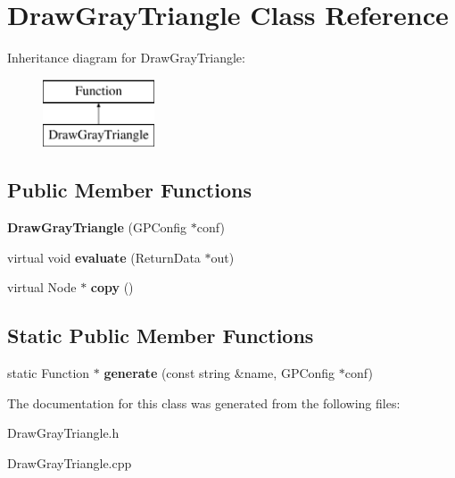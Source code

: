 \hypertarget{class_draw_gray_triangle}{\section{Draw\-Gray\-Triangle Class Reference}
\label{class_draw_gray_triangle}
}
Inheritance diagram for Draw\-Gray\-Triangle\-:\begin{figure}[H]
\begin{center}
\leavevmode
\includegraphics[height=2.000000cm]{class_draw_gray_triangle}
\end{center}
\end{figure}
\subsection*{Public Member Functions}
\begin{DoxyCompactItemize}
\item 
\hypertarget{class_draw_gray_triangle_a7a518e20ef8d09167ce78beb13c736cd}{{\bfseries Draw\-Gray\-Triangle} (G\-P\-Config $\ast$conf)}\label{class_draw_gray_triangle_a7a518e20ef8d09167ce78beb13c736cd}

\item 
\hypertarget{class_draw_gray_triangle_a17a78c3748736ef48dc8951b07361e68}{virtual void {\bfseries evaluate} (Return\-Data $\ast$out)}\label{class_draw_gray_triangle_a17a78c3748736ef48dc8951b07361e68}

\item 
\hypertarget{class_draw_gray_triangle_a085f4c505bbb6ff6e129649f29917276}{virtual Node $\ast$ {\bfseries copy} ()}\label{class_draw_gray_triangle_a085f4c505bbb6ff6e129649f29917276}

\end{DoxyCompactItemize}
\subsection*{Static Public Member Functions}
\begin{DoxyCompactItemize}
\item 
\hypertarget{class_draw_gray_triangle_ac9f2292e5d9b3709bb4f5fbb80a73e25}{static Function $\ast$ {\bfseries generate} (const string \&name, G\-P\-Config $\ast$conf)}\label{class_draw_gray_triangle_ac9f2292e5d9b3709bb4f5fbb80a73e25}

\end{DoxyCompactItemize}


The documentation for this class was generated from the following files\-:\begin{DoxyCompactItemize}
\item 
Draw\-Gray\-Triangle.\-h\item 
Draw\-Gray\-Triangle.\-cpp\end{DoxyCompactItemize}
